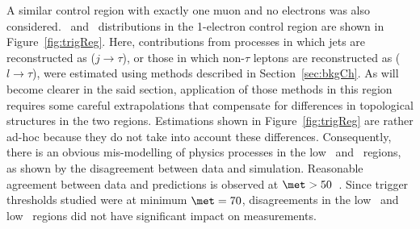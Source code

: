 \par A similar control region with exactly one muon and no electrons was also considered. 
\mT\ and \met\ distributions in the 1-electron control region are shown in 
Figure~\ref{fig:trigReg}. Here, contributions from processes in which jets are reconstructed as \tauvis ($j\to\tau$), or 
those in which non-$\tau$ leptons are reconstructed as \tauvis ($l\to\tau$), 
were estimated using methods described in Section~\ref{sec:bkgCh}. As will become clearer in 
the said section, application of those methods in this region requires some careful extrapolations 
that compensate for differences in topological structures in the two regions. Estimations shown 
in Figure~\ref{fig:trigReg} are rather ad-hoc because they do not take into account these differences.  
Consequently, there is an obvious mis-modelling of physics processes in the low 
\met\ and \mT\ regions, as shown by the disagreement between data and simulation.
Reasonable agreement between data and predictions is observed at $\met>50$~\GeV.
Since trigger thresholds 
studied were at minimum $\met=70$, disagreements in the low \met\ and low \mT\ regions did not have significant impact on 
measurements.

